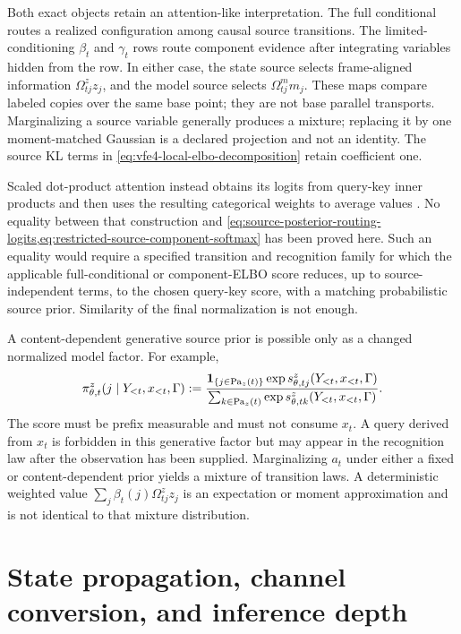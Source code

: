 Both exact objects retain an attention-like interpretation. The full conditional routes a realized configuration among causal source transitions. The limited-conditioning $\beta_t$ and $\gamma_t$ rows route component evidence after integrating variables hidden from the row. In either case, the state source selects frame-aligned information $\Omega^z_{tj}z_j$, and the model source selects $\Omega^m_{tj}m_j$. These maps compare labeled copies over the same base point; they are not base parallel transports. Marginalizing a source variable generally produces a mixture; replacing it by one moment-matched Gaussian is a declared projection and not an identity. The source KL terms in \cref{eq:vfe4-local-elbo-decomposition} retain coefficient one.

Scaled dot-product attention instead obtains its logits from query-key inner products and then uses the resulting categorical weights to average values \citep{Vaswani2017}. No equality between that construction and \cref{eq:source-posterior-routing-logits,eq:restricted-source-component-softmax} has been proved here. Such an equality would require a specified transition and recognition family for which the applicable full-conditional or component-ELBO score reduces, up to source-independent terms, to the chosen query-key score, with a matching probabilistic source prior. Similarity of the final normalization is not enough.

A content-dependent generative source prior is possible only as a changed normalized model factor. For example,
\begin{equation}
\pi_{\theta,t}^z(j\mid Y_{<t},x_{<t},\Gamma)
:=
\frac{
\mathbf 1_{\{j\in\operatorname{Pa}_z(t)\}}
\exp s_{\theta,tj}^z(Y_{<t},x_{<t},\Gamma)
}{
\sum_{k\in\operatorname{Pa}_z(t)}
\exp s_{\theta,tk}^z(Y_{<t},x_{<t},\Gamma)
}.
\label{eq:prefix-measurable-content-source-prior}
\end{equation}
The score must be prefix measurable and must not consume $x_t$. A query derived from $x_t$ is forbidden in this generative factor but may appear in the recognition law after the observation has been supplied. Marginalizing $a_t$ under either a fixed or content-dependent prior yields a mixture of transition laws. A deterministic weighted value $\sum_j\beta_t(j)\Omega^z_{tj}z_j$ is an expectation or moment approximation and is not identical to that mixture distribution.

\section{State propagation, channel conversion, and inference depth}

